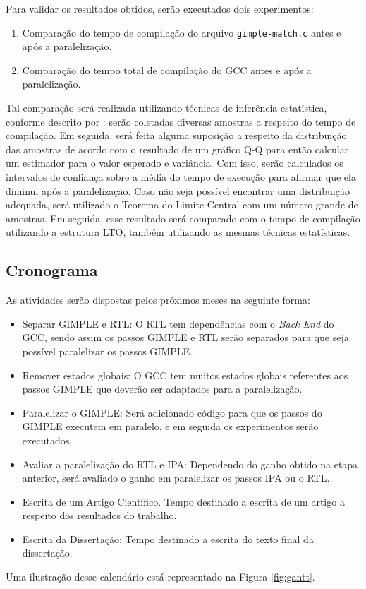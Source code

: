 Para validar os resultados obtidos, serão executados dois experimentos:
\begin{enumerate}
    \item Comparação do tempo de compilação do arquivo \texttt{gimple-match.c}
        antes e após a paralelização.


    \item Comparação do tempo total de compilação do GCC antes e após a paralelização.
\end{enumerate}
Tal comparação será realizada utilizando
técnicas de inferência estatística, conforme descrito por
\cite{morettin2017estatistica}: serão
coletadas diversas amostras a respeito do tempo de compilação. Em seguida, será feita alguma suposição a respeito da distribuição
das amostras de acordo com o resultado de um gráfico Q-Q para então calcular um estimador
para o valor esperado e variância. Com isso, serão calculados os intervalos de confiança
sobre a média do tempo de execução para afirmar que ela diminui após a paralelização. Caso
não seja possível encontrar uma distribuição adequada, será utilizado o Teorema do Limite
Central com um número grande de amostras. Em seguida, esse resultado será comparado com o
tempo de compilação utilizando a estrutura LTO, também utilizando as mesmas técnicas estatísticas.

\subsection{Cronograma}

As atividades serão dispostas pelos próximos meses na seguinte forma:

\begin{itemize}
	\item Separar GIMPLE e RTL: O RTL tem dependências com o \textit{Back End}
	do GCC, sendo assim os passos GIMPLE e RTL serão separados para que seja
	possível paralelizar os passos GIMPLE.

	\item Remover estados globais: O GCC tem muitos estados globais referentes
	aos passos GIMPLE que deverão ser adaptados para a paralelização.

	\item Paralelizar o GIMPLE: Será adicionado código para que os passos do
	GIMPLE executem em paralelo, e em seguida os experimentos serão executados.

	\item Avaliar a paralelização do RTL e IPA: Dependendo do ganho obtido
	na etapa anterior, será avaliado o ganho em paralelizar os passos IPA ou
	o RTL.

    \item Escrita de um Artigo Científico. Tempo destinado a escrita de um
        artigo a respeito dos resultados do trabalho.

	\item Escrita da Dissertação: Tempo destinado a escrita do texto final da
        dissertação.
\end{itemize}
Uma ilustração desse calendário está representado na Figura \ref{fig:gantt}.

